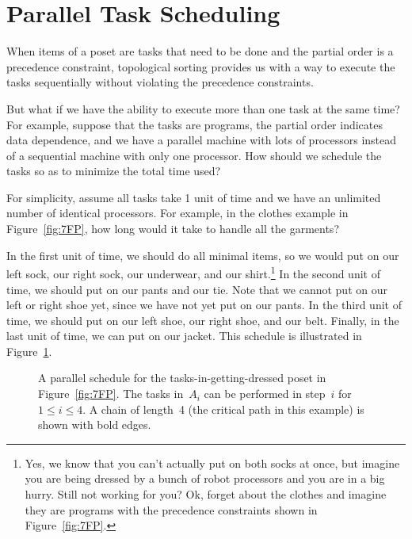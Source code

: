 \section{Parallel Task Scheduling}\label{sec:parallel_task}

When items of a poset are tasks that need to be done and the partial
order is a precedence constraint, topological sorting provides us with
a way to execute the tasks sequentially without violating the
precedence constraints.

But what if we have the ability to execute more than one task at the
same time?  For example, suppose that the tasks are programs, the
partial order indicates data dependence, and we have a parallel
machine with lots of processors instead of a sequential machine with
only one processor.  How should we schedule the tasks so as to
minimize the total time used?

For simplicity, assume all tasks take 1 unit of time and we have an
unlimited number of identical processors.  For example, in the clothes
example in Figure~\ref{fig:7FP}, how long would it take to handle all
the garments?

In the first unit of time, we should do all minimal items, so we would
put on our left sock, our right sock, our underwear, and our
shirt.\footnote{Yes, we know that you can't actually put on both socks
  at once, but imagine you are being dressed by a bunch of robot
  processors and you are in a big hurry.  Still not working for you?
  Ok, forget about the clothes and imagine they are programs with the
  precedence constraints shown in Figure~\ref{fig:7FP}.}  In the
second unit of time, we should put on our pants and our tie.  Note
that we cannot put on our left or right shoe yet, since we have not
yet put on our pants.  In the third unit of time, we should put on our
left shoe, our right shoe, and our belt.  Finally, in the last unit of
time, we can put on our jacket.  This schedule is illustrated in
Figure~\ref{fig:7FS}.

\begin{figure}


\caption{A parallel schedule for the tasks-in-getting-dressed poset in
Figure~\ref{fig:7FP}.  The tasks in~$A_i$ can be performed in step~$i$
for $1 \le i \le 4$.  A chain of length~4 (the critical path in this
example) is shown with bold edges.}

\label{fig:7FS}

\end{figure}

